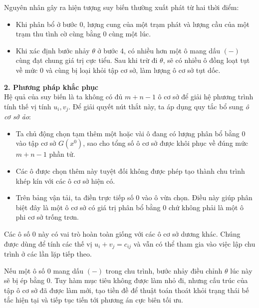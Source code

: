 \documentclass[../main.tex]{subfiles}
\begin{document}
Nguyên nhân gây ra hiện tượng suy biến thường xuất phát từ hai thời điểm:
\begin{itemize}
    \item Khi phân bổ ở bước 0, lượng cung của một trạm phát và lượng cầu của một trạm thu tình cờ cùng bằng 0 cùng một lúc.
    \item Khi xác định bước nhảy $\theta$ ở bước 4, có nhiều hơn một ô mang dấu $(-)$ cùng đạt chung giá trị cực tiểu. Sau khi trừ đi $\theta$, sẽ có nhiều ô đồng loạt tụt về mức $0$ và cùng bị loại khỏi tập cơ sở, làm lượng ô cơ sở tụt dốc.
\end{itemize}

\noindent \textbf{2. Phương pháp khắc phục} \\
Hệ quả của suy biến là ta không có đủ $m+n-1$ ô cơ sở để giải hệ phương trình tính thế vị tính $u_i, v_j$. Để giải quyết nút thắt này, ta áp dụng quy tắc bổ sung \textit{ô cơ sở ảo}:
\begin{itemize}
    \item Ta chủ động chọn tạm thêm một hoặc vài ô đang có lượng phân bổ bằng $0$ vào tập cơ sở $G(x^0)$, sao cho tổng số ô cơ sở được khôi phục về đúng mức $m+n-1$ phần tử.
    \item Các ô được chọn thêm này tuyệt đối không được phép tạo thành chu trình khép kín với các ô cơ sở hiện có.
    \item Trên bảng vận tải, ta điền trực tiếp số $0$ vào ô vừa chọn. Điều này giúp phân biệt đây là một ô cơ sở có giá trị phân bổ bằng 0 chứ không phải là một ô phi cơ sở trống trơn.
\end{itemize}

Các ô số $0$ này có vai trò hoàn toàn giống với các ô cơ sở dương khác. Chúng được dùng để tính các thế vị $u_i + v_j = c_{ij}$ và vẫn có thể tham gia vào việc lập chu trình ở các lần lặp tiếp theo.

Nếu một ô số $0$ mang dấu $(-)$ trong chu trình, bước nhảy điều chỉnh $\theta$ lúc này sẽ bị ép bằng $0$. Tuy hàm mục tiêu không được làm nhỏ đi, nhưng cấu trúc của tập ô cơ sở đã được làm mới, tạo tiền đề để thuật toán thoát khỏi trạng thái bế tắc hiện tại và tiếp tục tiến tới phương án cực biên tối ưu.
\end{document}
